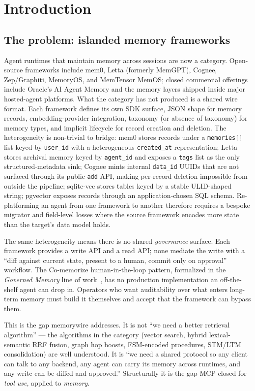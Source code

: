 \documentclass[11pt,letterpaper,twocolumn]{article}
\begin{document}
\section{Introduction}
\label{sec:intro}

\subsection{The problem: islanded memory frameworks}
\label{sec:intro-problem}

Agent runtimes that maintain memory across sessions are now a category. Open-source frameworks include mem0, Letta (formerly MemGPT), Cognee, Zep/Graphiti, MemoryOS, and MemTensor MemOS; closed commercial offerings include Oracle's AI Agent Memory and the memory layers shipped inside major hosted-agent platforms. What the category has not produced is a shared wire format. Each framework defines its own SDK surface, JSON shape for memory records, embedding-provider integration, taxonomy (or absence of taxonomy) for memory types, and implicit lifecycle for record creation and deletion. The heterogeneity is non-trivial to bridge: mem0 stores records under a \texttt{memories[]} list keyed by \texttt{user\_id} with a heterogeneous \texttt{created\_at} representation; Letta stores archival memory keyed by \texttt{agent\_id} and exposes a \texttt{tags} list as the only structured-metadata sink; Cognee mints internal \texttt{data\_id} UUIDs that are not surfaced through its public \texttt{add} API, making per-record deletion impossible from outside the pipeline; sqlite-vec stores tables keyed by a stable ULID-shaped string; pgvector exposes records through an application-chosen SQL schema. Re-platforming an agent from one framework to another therefore requires a bespoke migrator and field-level losses where the source framework encodes more state than the target's data model holds.

The same heterogeneity means there is no shared \emph{governance} surface. Each framework provides a write API and a read API; none mediate the write with a ``diff against current state, present to a human, commit only on approval'' workflow. The Co-memorize human-in-the-loop pattern, formalized in the \emph{Governed Memory} line of work~\cite{taheri2026governed}, has no production implementation an off-the-shelf agent can drop in. Operators who want auditability over what enters long-term memory must build it themselves and accept that the framework can bypass them.

This is the gap memorywire addresses. It is not ``we need a better retrieval algorithm'' --- the algorithms in the category (vector search, hybrid lexical-semantic RRF fusion, graph hop boosts, FSM-encoded procedures, STM/LTM consolidation) are well understood. It is ``we need a shared protocol so any client can talk to any backend, any agent can carry its memory across runtimes, and any write can be diffed and approved.'' Structurally it is the gap MCP closed for \emph{tool use}, applied to \emph{memory}.
\end{document}
